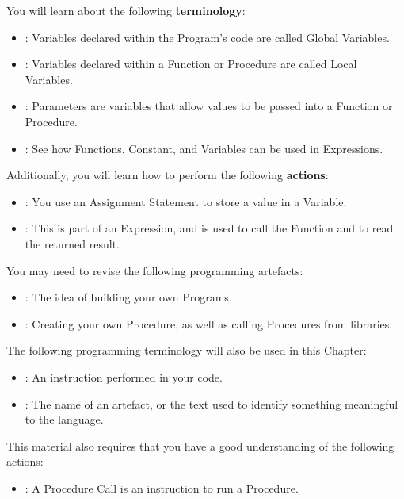 You will learn about the following \textbf{terminology}:
\begin{itemize}
  \item {}: Variables declared within the Program's code are called Global Variables.
  \item {}: Variables declared within a Function or Procedure are called Local Variables.
  \item {}: Parameters are variables that allow values to be passed into a Function or Procedure.
  \item {}: See how Functions, Constant, and Variables can be used in Expressions.
\end{itemize}

Additionally, you will learn how to perform the following \textbf{actions}:
\begin{itemize}
  \item {}: You use an Assignment Statement to store a value in a Variable.
  \item {}: This is part of an Expression, and is used to call the Function and to read the returned result.
\end{itemize}

\bigskip

You may need to revise the following programming artefacts:
\begin{itemize}
  \item {}: The idea of building your own Programs.
  \item {}: Creating your own Procedure, as well as calling Procedures from libraries.
\end{itemize}

The following programming terminology will also be used in this Chapter:
\begin{itemize}
  \item {}: An instruction performed in your code.
  \item {}: The name of an artefact, or the text used to identify something meaningful to the language.
\end{itemize}

This material also requires that you have a good understanding of the following actions:
\begin{itemize}
  \item {}: A Procedure Call is an instruction to run a Procedure.
\end{itemize}

